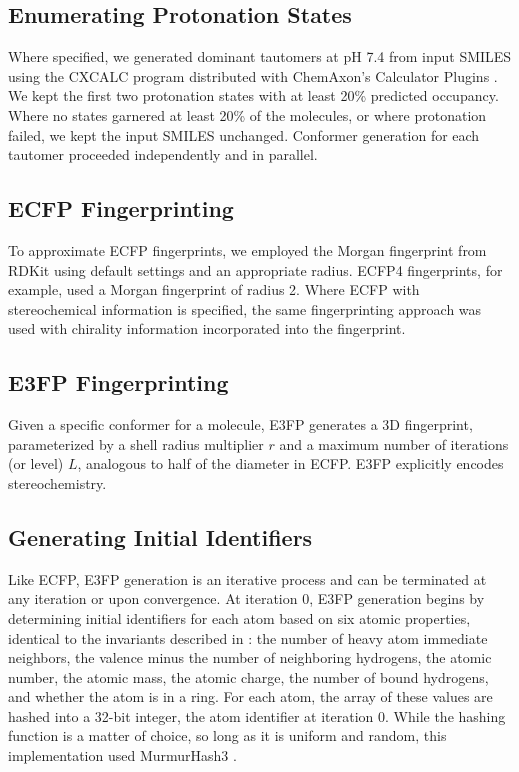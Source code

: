 \documentclass[../main.tex]{subfiles}
\begin{document}
\begin{refsection}
\subsection*{Enumerating Protonation States}

Where specified, we generated dominant tautomers at pH 7.4 from input SMILES using the CXCALC program distributed with ChemAxon's Calculator Plugins \cite{chemaxon_software_2015}.
We kept the first two protonation states with at least 20\% predicted occupancy.
Where no states garnered at least 20\% of the molecules, or where protonation failed, we kept the input SMILES unchanged.
Conformer generation for each tautomer proceeded independently and in parallel.

\subsection*{ECFP Fingerprinting}

To approximate ECFP fingerprints, we employed the Morgan fingerprint from RDKit using default settings and an appropriate radius.
ECFP4 fingerprints, for example, used a Morgan fingerprint of radius 2.
Where ECFP with stereochemical information is specified, the same fingerprinting approach was used with chirality information incorporated into the fingerprint.

\subsection*{E3FP Fingerprinting}

Given a specific conformer for a molecule, E3FP generates a 3D fingerprint, parameterized by a shell radius multiplier $r$ and a maximum number of iterations (or level) $L$, analogous to half of the diameter in ECFP.
E3FP explicitly encodes stereochemistry.

\subsection*{Generating Initial Identifiers}

Like ECFP, E3FP generation is an iterative process and can be terminated at any iteration or upon convergence.
At iteration 0, E3FP generation begins by determining initial identifiers for each atom based on six atomic properties, identical to the invariants described in  \cite{rogers_2010} : the number of heavy atom immediate neighbors, the valence minus the number of neighboring hydrogens, the atomic number, the atomic mass, the atomic charge, the number of bound hydrogens, and whether the atom is in a ring.
For each atom, the array of these values are hashed into a 32-bit integer, the atom identifier at iteration 0.
While the hashing function is a matter of choice, so long as it is uniform and random, this implementation used MurmurHash3  \cite{appleby_website}.


\end{refsection}
\end{document}
